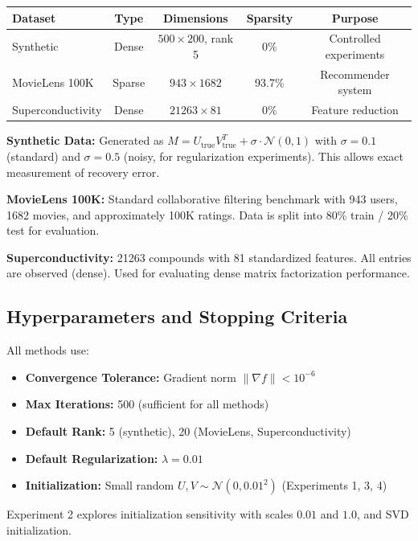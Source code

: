 \documentclass[11pt,a4paper]{article}
\begin{document}
\begin{table}[h]
\centering
\begin{tabular}{|l|c|c|c|c|}
\hline
\textbf{Dataset} & \textbf{Type} & \textbf{Dimensions} & \textbf{Sparsity} & \textbf{Purpose} \\
\hline
Synthetic & Dense & $500 \times 200$, rank 5 & 0\% & Controlled experiments \\
\hline
MovieLens 100K & Sparse & $943 \times 1682$ & 93.7\% & Recommender system \\
\hline
Superconductivity & Dense & $21263 \times 81$ & 0\% & Feature reduction \\
\hline
\end{tabular}
\end{table}

\textbf{Synthetic Data:} Generated as $M = U_{\text{true}} V_{\text{true}}^T + \sigma \cdot \mathcal{N}(0, 1)$ with $\sigma = 0.1$ (standard) and $\sigma = 0.5$ (noisy, for regularization experiments). This allows exact measurement of recovery error.

\textbf{MovieLens 100K:} Standard collaborative filtering benchmark with 943 users, 1682 movies, and approximately 100K ratings. Data is split into 80\% train / 20\% test for evaluation.

\textbf{Superconductivity:} 21263 compounds with 81 standardized features. All entries are observed (dense). Used for evaluating dense matrix factorization performance.

\subsection{Hyperparameters and Stopping Criteria}

All methods use:
\begin{itemize}
  \item \textbf{Convergence Tolerance:} Gradient norm $\|\nabla f\| < 10^{-6}$
  \item \textbf{Max Iterations:} 500 (sufficient for all methods)
  \item \textbf{Default Rank:} 5 (synthetic), 20 (MovieLens, Superconductivity)
  \item \textbf{Default Regularization:} $\lambda = 0.01$
  \item \textbf{Initialization:} Small random $U, V \sim \mathcal{N}(0, 0.01^2)$ (Experiments 1, 3, 4)
\end{itemize}

Experiment 2 explores initialization sensitivity with scales $0.01$ and $1.0$, and SVD initialization.
\end{document}
